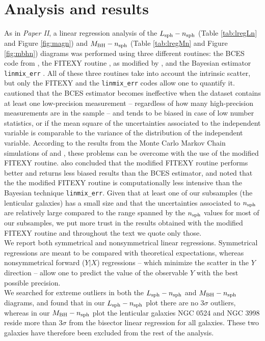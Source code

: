 \documentclass[preprint2]{emulateapj}
\begin{document}


\section{Analysis and results}
\label{sec:anal}
As in \emph{Paper II}, a linear regression analysis of the $L_{\rm sph} - n_{\rm sph}$ 
(Table \ref{tab:lregLn} and Figure \ref{fig:magn})
and $M_{\rm BH} - n_{\rm sph}$ (Table \ref{tab:lregMn} and Figure \ref{fig:mbhn}) diagrams 
was performed using three different routines: 
the BCES code from \cite{akritasbershady1996}, 
the FITEXY routine \citep{press1992}, as modified by \cite{tremaine2002}, 
and the Bayesian estimator {\tt linmix\_err} \citep{linmixerr}.
All of these three routines take into account the intrinsic scatter, 
but only the FITEXY and the {\tt linmix\_err} codes allow one to quantify it.
\cite{tremaine2002} cautioned that 
the BCES estimator becomes ineffective when the dataset contains at least one low-precision measurement -- 
regardless of how many high-precision measurements are in the sample -- 
and tends to be biased in case of low number statistics, 
or if the mean square of the uncertainties associated to the independent variable is comparable to 
the variance of the distribution of the independent variable. 
According to the results from the Monte Carlo Markov Chain simulations of \cite{tremaine2002} and \cite{novak2006}, 
these problems can be overcome with the use of the modified FITEXY routine. 
\cite{park2012} also concluded that the modified FITEXY routine performs better and returns less biased results than the BCES estimator, 
and noted that the the modified FITEXY routine is computationally less intensive than the Bayesian technique {\tt linmix\_err}. 
Given that at least one of our subsamples (the lenticular galaxies) has a small size 
and that the uncertainties associated to $n_{\rm sph}$ are relatively large 
compared to the range spanned by the $n_{\rm sph}$ values for most of our subsamples, 
we put more trust in the results obtained with the modified FITEXY routine 
and throughout the text we quote only those. \\ 
We report both symmetrical and nonsymmetrical linear regressions.  
Symmetrical regressions are meant to be compared with theoretical expectations, 
whereas nonsymmetrical forward ($Y|X$) regressions -- which minimize the scatter in the $Y$ direction -- 
allow one to predict the value of the observable $Y$ with the best possible precision. \\
We searched for extreme outliers in both the $L_{\rm sph} - n_{\rm sph}$ and $M_{\rm BH} - n_{\rm sph}$ diagrams, 
and found that in our $L_{\rm sph} - n_{\rm sph}$ plot there are no $3\sigma$ outliers, 
whereas in our $M_{\rm BH} - n_{\rm sph}$ plot 
the lenticular galaxies NGC 0524 and NGC 3998 reside more than $3\sigma$ from the bisector linear regression for all galaxies. 
These two galaxies have therefore been excluded from the rest of the analysis. 
\end{document}
